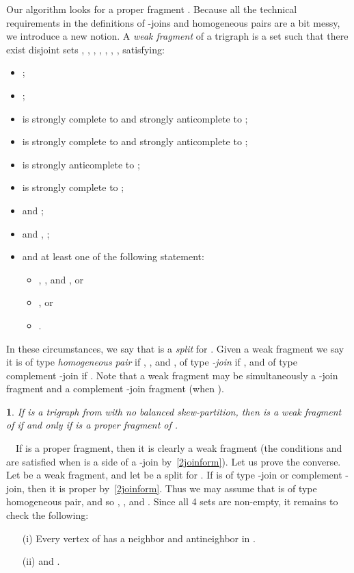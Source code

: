\documentclass[11 pt] {article}
\newtheorem{theorem}{}[section]
\newcounter{claim}
\newcommand{\Proof}{\setcounter{claim}{0}\noindent{\bf Proof.}\ \ }
\begin{document}
Our algorithm looks for a proper fragment .  Because all the
technical requirements in the definitions of -joins and homogeneous
pairs are a bit messy, we introduce a new notion.  A \emph{weak
  fragment} of a trigraph  is a set  such that
there exist disjoint sets , , , , , ,
,  satisfying:

\begin{itemize}
\item ;
\item  ;
\item  is strongly complete to  and strongly
  anticomplete to ;
\item  is strongly complete to  and strongly
 anticomplete to ;
\item  is strongly anticomplete to ;
\item  is strongly complete to ;
\item  and ;
\item  and , ;
\item and at least one of the following statement:

\begin{itemize}
\item , , and ,  or
\item , or
\item .
\end{itemize}
\end{itemize}


In these circumstances, we say that  is a \emph{split} for .
Given a weak fragment we say it is of type {\em homogeneous pair}
if , , and , of 
type {\em -join} if , and
of type {complement -join} if . 
Note that a weak fragment may be simultaneously a -join fragment and
a complement -join fragment (when ). 

\begin{theorem}
\label{weakstruct}
If  is a trigraph from  with no balanced
skew-partition, then  is a weak fragment of  if and only if 
is a proper fragment of .
\end{theorem}

\Proof If  is a proper fragment, then it is clearly a weak fragment (the
conditions  and  are satisfied
when  is a side of a -join by~\ref{2joinform}).  Let us prove the
converse. Let  be a weak fragment, and let 
 be a split for . If 
is of type -join  or complement -join, then  it is proper
by~\ref{2joinform}. Thus we may assume that  is
of type homogeneous pair, and so
, , and .
Since all 4 sets  are non-empty, it remains to check the
following:
\begin{itemize}
\item[(i)] Every vertex of  has a neighbor and antineighbor
in . 
\item[(ii)]  and .
\end{itemize}
 
\end{document}
